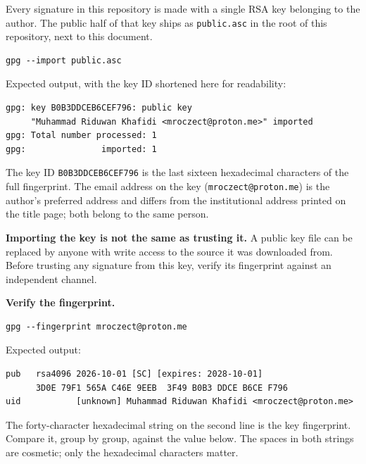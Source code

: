 Every signature in this repository is made with a single RSA key
belonging to the author. The public half of that key ships as
\texttt{public.asc} in the root of this repository, next to this
document.

\begin{lstlisting}[style=code]
gpg --import public.asc
\end{lstlisting}

Expected output, with the key ID shortened here for readability:

\begin{lstlisting}[style=out]
gpg: key B0B3DDCEB6CEF796: public key
     "Muhammad Riduwan Khafidi <mroczect@proton.me>" imported
gpg: Total number processed: 1
gpg:               imported: 1
\end{lstlisting}

The key ID \texttt{B0B3DDCEB6CEF796} is the last sixteen
hexadecimal characters of the full fingerprint. The email address
on the key (\texttt{mroczect@proton.me}) is the author's preferred
address and differs from the institutional address printed on the
title page; both belong to the same person.

\textbf{Importing the key is not the same as trusting it.} A public
key file can be replaced by anyone with write access to the source
it was downloaded from. Before trusting any signature from this
key, verify its fingerprint against an independent channel.

\smallskip
\noindent\textbf{Verify the fingerprint.}
\par\smallskip

\begin{lstlisting}[style=code]
gpg --fingerprint mroczect@proton.me
\end{lstlisting}

Expected output:

\begin{lstlisting}[style=out]
pub   rsa4096 2026-10-01 [SC] [expires: 2028-10-01]
      3D0E 79F1 565A C46E 9EEB  3F49 B0B3 DDCE B6CE F796
uid           [unknown] Muhammad Riduwan Khafidi <mroczect@proton.me>
\end{lstlisting}

The forty-character hexadecimal string on the second line is the
key fingerprint. Compare it, group by group, against the value
below. The spaces in both strings are cosmetic; only the
hexadecimal characters matter.

\par\smallskip
{}
\par\smallskip

